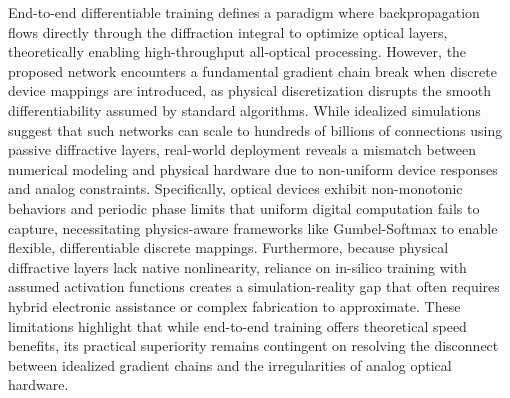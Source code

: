 End-to-end differentiable training defines a paradigm where backpropagation flows directly through the diffraction integral to optimize optical layers, theoretically enabling high-throughput all-optical processing. However, the proposed network encounters a fundamental gradient chain break when discrete device mappings are introduced, as physical discretization disrupts the smooth differentiability assumed by standard algorithms. While idealized simulations suggest that such networks can scale to hundreds of billions of connections using passive diffractive layers, real-world deployment reveals a mismatch between numerical modeling and physical hardware due to non-uniform device responses and analog constraints. Specifically, optical devices exhibit non-monotonic behaviors and periodic phase limits that uniform digital computation fails to capture, necessitating physics-aware frameworks like Gumbel-Softmax to enable flexible, differentiable discrete mappings. \citep{doi_10_1145_3508352_3549378_13c53996} Furthermore, because physical diffractive layers lack native nonlinearity, reliance on in-silico training with assumed activation functions creates a simulation-reality gap that often requires hybrid electronic assistance or complex fabrication to approximate. These limitations highlight that while end-to-end training offers theoretical speed benefits, its practical superiority remains contingent on resolving the disconnect between idealized gradient chains and the irregularities of analog optical hardware. \citep{doi_10_1145_3508352_3549378_13c53996} \citep{doi_10_1126_science_aat8084_e055772d} \citep{doi_10_1109_dac56929_2023_10247715_f78d6713} \citep{doi_10_1126_sciadv_adu0904_786138ff}

